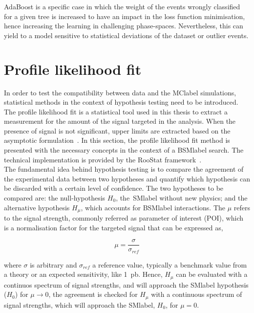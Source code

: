 AdaBoost is a specific case in which the weight of the events wrongly classified for a given tree is increased to have an impact in the loss function minimisation, hence increasing the learning in challenging phase-spaces. Nevertheless, this can yield to a model sensitive to statistical deviations of the dataset or outlier events.


\section{Profile likelihood fit}
\label{sec:profilelikelihoodfit}

In order to test the compatibility between data and the \acrshort{MClabel} simulations, statistical methods in the context of hypothesis testing need to be introduced. The profile likelihood fit is a statistical tool used in this thesis to extract a measurement for the amount of the signal targeted in the analysis. When the presence of signal is not significant, upper limits are extracted based on the asymptotic formulation~\cite{Cowan_2011}. In this section, the profile likelihood fit method is presented with the necessary concepts in the context of a \acrshort{BSMlabel} search.
The technical implementation is provided by the RooStat framework~\cite{10.48550/arxiv.1009.1003}.\\

The fundamental idea behind hypothesis testing is to compare the agreement of the experimental data between two hypotheses and quantify which hypothesis can be discarded with a certain level of confidence. The two hypotheses to be compared are: the null-hypothesis $H_0$, the~\acrshort{SMlabel} without new physics; and the alternative hypothesis $H_\mu$, which accounts for \acrshort{BSMlabel} interactions. The $\mu$ refers to the signal strength, commonly referred as parameter of interest (POI), which is a normalisation factor for the targeted signal that can be expressed as,

\begin{equation}
    \mu = \frac{\sigma}{\sigma_{ref}}
\end{equation}

where $\sigma$ is arbitrary and $\sigma_{ref}$ a reference value, typically a benchmark value from a theory or an expected sensitivity, like 1~pb. Hence, $H_\mu$ can be evaluated with a continuos spectrum of signal strengths, and will approach the \acrshort{SMlabel} hypothesis ($H_0$) for $\mu\to0$, the agreement is checked for $H_\mu$ with a continuous spectrum of signal strengths, which will approach the \acrshort{SMlabel}, $H_0$, for $\mu=0$.\\

